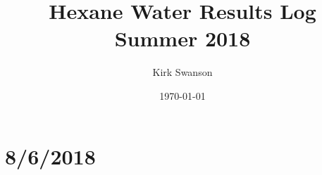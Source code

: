 \documentclass[12pt,reqno]{amsart}
\numberwithin{equation}{section}
\begin{document}
\title{Hexane Water Results Log Summer 2018}
\author{Kirk Swanson}
\address{Institute for Molecular Engineering, University of Chicago, 5640 S Ellis Ave, Chicago, IL 60637}
\date{\today}




\maketitle


\normalsize

\section{8/6/2018}
\end{document}
